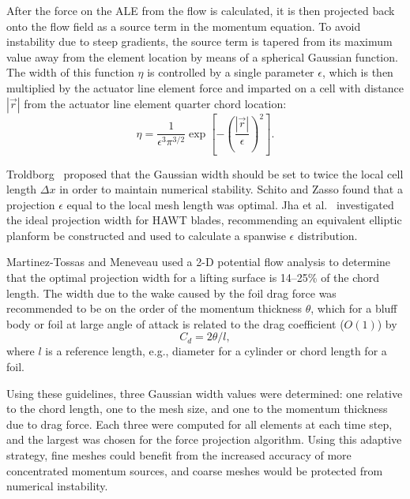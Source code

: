 \documentclass[times]{weauth}
\begin{document}
After the force on the ALE from the flow is calculated, it is then projected
back onto the flow field as a source term in the momentum equation. To avoid
instability due to steep gradients, the source term is tapered from its maximum
value away from the element location by means of a spherical Gaussian function.
The width of this function $\eta$ is controlled by a single parameter
$\epsilon$, which is then multiplied by the actuator line element force and
imparted on a cell with distance $| \vec{r} |$ from the actuator line element
quarter chord location:
\begin{equation}
    \eta = \frac{1}{\epsilon^3 \pi^{3/2}} \exp
    \left[ - \left( \frac{| \vec{r} |}{\epsilon} \right)^2 \right].
    \label{eq:projection}
\end{equation}

Troldborg~\cite{Troldborg2008} proposed that the Gaussian width should be set to
twice the local cell length $\Delta x$ in order to maintain numerical stability.
Schito and Zasso \cite{Schito2014} found that a projection $\epsilon$ equal to
the local mesh length was optimal. Jha et al.~\cite{Jha2014} investigated the
ideal projection width for HAWT blades, recommending an equivalent elliptic
planform be constructed and used to calculate a spanwise $\epsilon$
distribution.

Martinez-Tossas and Meneveau \cite{Martinez-Tossas2015b} used a 2-D potential
flow analysis to determine that the optimal projection width for a lifting
surface is 14--25\% of the chord length. The width due to the wake caused by the
foil drag force was recommended to be on the order of the momentum thickness
$\theta$, which for a bluff body or foil at large angle of attack is related to
the drag coefficient ($O(1)$) by \cite{TennekesAndLumley}
\begin{equation}
    C_d = 2 \theta / l,
    \label{eq:mom-thickness}
\end{equation}
where $l$ is a reference length, e.g., diameter for a cylinder or chord length
for a foil.

Using these guidelines, three Gaussian width values were determined: one
relative to the chord length, one to the mesh size, and one to the momentum
thickness due to drag force. Each three were computed for all elements at each
time step, and the largest was chosen for the force projection algorithm. Using
this adaptive strategy, fine meshes could benefit from the increased accuracy of
more concentrated momentum sources, and coarse meshes would be protected from
numerical instability.
\end{document}
